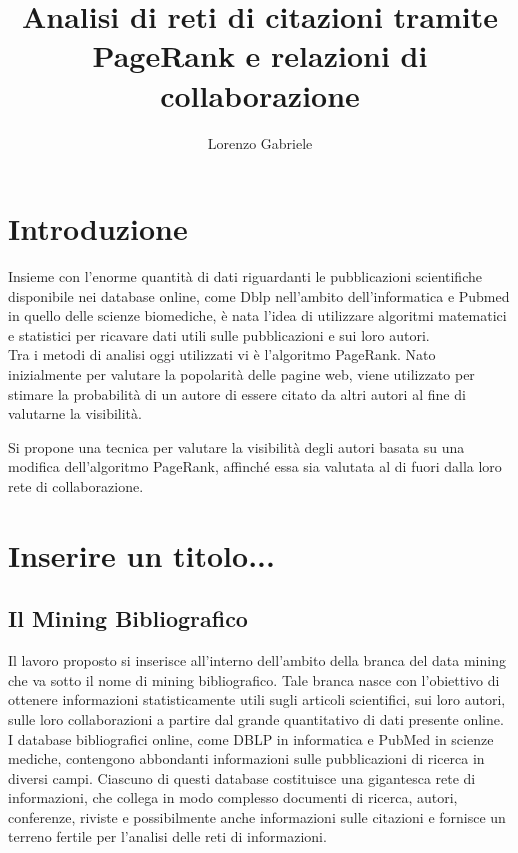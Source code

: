 \documentclass[a4paper, 12pt]{article}
\title{Analisi di reti di citazioni tramite PageRank e relazioni di collaborazione}
\author{Lorenzo Gabriele}
\let\oldsection\section
\renewcommand\section{\clearpage\oldsection}
\begin{document}
\maketitle
\clearpage
\tableofcontents
\clearpage

\section{Introduzione}
Insieme con l'enorme quantità di dati riguardanti le pubblicazioni scientifiche disponibile nei database online, come Dblp nell'ambito dell'informatica e Pubmed in quello delle scienze biomediche, è nata l'idea di utilizzare algoritmi matematici e statistici per ricavare dati utili sulle pubblicazioni e sui loro autori. \\
Tra i metodi di analisi oggi utilizzati vi è l'algoritmo PageRank. Nato inizialmente per valutare la popolarità delle pagine web, viene utilizzato per stimare la probabilità di un autore di essere citato da altri autori al fine di valutarne la visibilità.
\par Si propone una tecnica per valutare la visibilità degli autori basata su una modifica dell'algoritmo PageRank, affinché essa sia valutata al di fuori dalla loro rete di collaborazione.

\section{Inserire un titolo...}
\subsection{Il Mining Bibliografico}
Il lavoro proposto si inserisce all'interno dell'ambito della branca del data mining che va sotto il nome di mining bibliografico. Tale branca nasce con l'obiettivo di ottenere informazioni statisticamente utili sugli articoli scientifici, sui loro autori, sulle loro collaborazioni a partire dal grande quantitativo di dati presente online. \\
I database bibliografici online, come DBLP in informatica e PubMed in scienze mediche, contengono abbondanti informazioni sulle pubblicazioni di ricerca in diversi campi. Ciascuno di questi database costituisce una gigantesca rete di informazioni, che collega in modo complesso documenti di ricerca, autori, conferenze, riviste e possibilmente anche informazioni sulle citazioni e fornisce un terreno fertile per l'analisi delle reti di informazioni.
\end{document}
